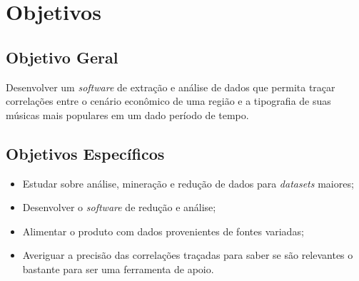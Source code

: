 \section{Objetivos}
\label{c.objetivos}

\subsection{Objetivo Geral}
\label{c.objetivo_g}
Desenvolver um \textit{software} de extração e análise de dados que permita traçar correlações entre o cenário econômico de uma região e a tipografia de suas músicas mais populares em um dado período de tempo.

\subsection{Objetivos Específicos}
\label{c.objetivo_e}
\begin{itemize}
    \item Estudar sobre análise, mineração e redução de dados para \textit{datasets} maiores;
    \item Desenvolver o \textit{software} de redução e análise;
    \item Alimentar o produto com dados provenientes de fontes variadas;
    \item Averiguar a precisão das correlações traçadas para saber se são relevantes o bastante para ser uma ferramenta de apoio.
\end{itemize}